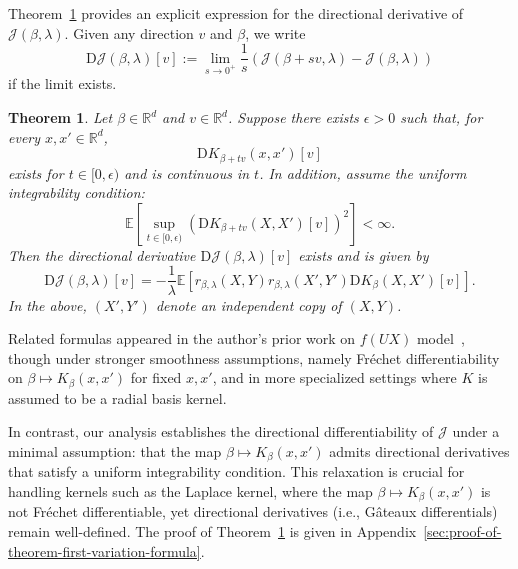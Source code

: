 \documentclass[sn-mathphys-num]{sn-jnl}%
\numberwithin{equation}{section}
\newcommand{\R}{\mathbb{R}}
\newcommand{\E}{\mathbb{E}}
\newcommand{\kernel}{K}
\newcommand{\eps}{\epsilon}
\theoremstyle{thmstyleone}%
\newtheorem{theorem}{Theorem}%
\theoremstyle{thmstyletwo}%
\theoremstyle{thmstylethree}%
\begin{document}
Theorem~\ref{theorem:first-variation-formula} provides an explicit expression for the directional derivative 
of $\mathcal{J}(\beta, \lambda)$. Given any direction $v$ and $\beta$, we write
\begin{equation*}
\mathrm{D} \mathcal{J}(\beta, \lambda)[v] := \lim_{s \to 0^+} \frac{1}{s} \left( \mathcal{J}(\beta + s v, \lambda) - \mathcal{J}(\beta, \lambda) \right)
\end{equation*}
if the limit exists. 

\vspace{.5em} 
\begin{theorem}
\label{theorem:first-variation-formula}
Let $\beta \in \R^d$ and $v \in \R^d$. Suppose there exists $\epsilon > 0$ such that, for every $x, x' \in \R^d$, %
\begin{equation*}
	\mathrm{D}\kernel_{\beta + tv}(x, x')[v]
\end{equation*}
exists for $t \in [0, \eps)$ and is continuous in $t$. In addition, 
assume the uniform integrability condition: 
\begin{equation*}
	 \E\left[\sup_{t \in [0, \eps)} (\mathrm{D} \kernel_{\beta + tv}(X, X')[v])^2\right] < \infty. 
\end{equation*}
Then the directional derivative $\mathrm{D} \mathcal{J}(\beta, \lambda)[v]$ exists and is given by 
\begin{equation*}
	\mathrm{D} \mathcal{J}(\beta, \lambda)[v] =
		- \frac{1}{\lambda} \E[r_{\beta, \lambda}(X, Y) r_{\beta, \lambda}(X', Y') \mathrm{D} \kernel_\beta(X, X')[v]].
\end{equation*}
In the above, $(X', Y')$ denote an independent copy of $(X, Y)$. 
\end{theorem} 

\vspace{.5em} 
Related formulas appeared in the author's prior work on $f(UX)$ model~\cite[Proposition 4.4]{LiRu25}, though under stronger smoothness assumptions, namely Fréchet differentiability on $\beta \mapsto \kernel_\beta(x, x')$ for fixed $x,x'$, and in more specialized settings where $\kernel$ is assumed to be a radial basis kernel.

In contrast, our analysis establishes the directional differentiability of $\mathcal{J}$ under a minimal assumption: that the map $\beta \mapsto \kernel_\beta(x, x')$ admits directional derivatives that satisfy a uniform integrability condition. This relaxation is crucial for handling kernels such as the Laplace kernel, where the map $\beta \mapsto \kernel_\beta(x, x')$ is not Fr\'{e}chet differentiable, yet directional derivatives (i.e., G\^{a}teaux differentials) remain well-defined. The proof of Theorem~\ref{theorem:first-variation-formula} is given in Appendix~\ref{sec:proof-of-theorem-first-variation-formula}.
\end{document}
